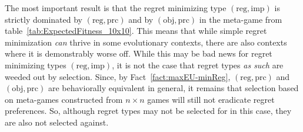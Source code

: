 \documentclass[fleqn,reqno,12pt]{article}
\theoremstyle{Satz}
\theoremstyle{Bsp}
\newcommand{\set}[1]{\left\{#1\right\}}
\renewcommand{\footnotesize}{\normalsize}
\begin{document}
\begin{table}[]
\centering
\footnotesize
{}                    
\caption{Average evolutionary fitness for 100,000 randomly generated $n \times n$ symmetric games with $n$ randomly drawn from $\set{2, \dots, 10}$.}
\label{tab:ExpectedFitness_10x10}        
\end{table}

The most important result is that the regret minimizing type $(\text{reg}, \text{imp})$ is
strictly dominated by $(\text{reg}, \text{prc})$ and by $(\text{obj}, \text{prc})$ in the
meta-game from table~\ref{tab:ExpectedFitness_10x10}. This means that while simple regret minimization
\emph{can} thrive in some evolutionary contexts, there are also contexts where it is
demonstrably worse off. While this may be bad news for regret minimizing types
$(\text{reg}, \text{imp})$, it is not the case that regret types \emph{as such} are weeded out
by selection. Since, by Fact~\ref{fact:maxEU-minReg}, $(\text{reg}, \text{prc})$ and
$(\text{obj}, \text{prc})$ are behaviorally equivalent in general, it remains that selection
based on meta-games constructed from $n \times n$ games will still not eradicate regret
preferences. So, although regret types may not be selected for in this case, they are also not
selected against.
\end{document}
